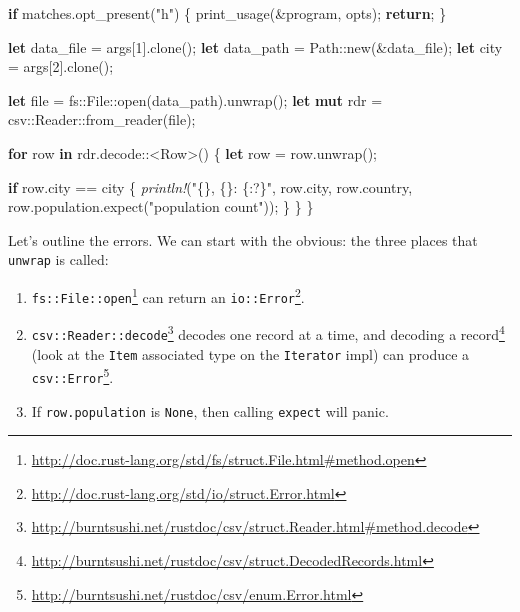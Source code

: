 \documentclass[a4paper,]{book}
\newenvironment{Shaded}{\begin{snugshade}}{\end{snugshade}}
\newcommand{\KeywordTok}[1]{\textcolor[rgb]{0.13,0.29,0.53}{\textbf{{#1}}}}
\newcommand{\DecValTok}[1]{\textcolor[rgb]{0.00,0.00,0.81}{{#1}}}
\newcommand{\StringTok}[1]{\textcolor[rgb]{0.31,0.60,0.02}{{#1}}}
\newcommand{\PreprocessorTok}[1]{\textcolor[rgb]{0.56,0.35,0.01}{\textit{{#1}}}}
\newcommand{\NormalTok}[1]{{#1}}
\renewcommand{\href}[2]{#2\footnote{\url{#1}}}
\providecommand{\tightlist}{%
  \setlength{\itemsep}{0pt}\setlength{\parskip}{0pt}}
\begin{document}
\begin{Shaded}
\begin{Highlighting}[]
    \KeywordTok{if} \NormalTok{matches.opt_present(}\StringTok{"h"}\NormalTok{) \{}
        \NormalTok{print_usage(&program, opts);}
        \KeywordTok{return}\NormalTok{;}
    \NormalTok{\}}
        
    \KeywordTok{let} \NormalTok{data_file = args[}\DecValTok{1}\NormalTok{].clone();}
    \KeywordTok{let} \NormalTok{data_path = Path::new(&data_file);}
    \KeywordTok{let} \NormalTok{city = args[}\DecValTok{2}\NormalTok{].clone();}
    
    \KeywordTok{let} \NormalTok{file = fs::File::open(data_path).unwrap();}
    \KeywordTok{let} \KeywordTok{mut} \NormalTok{rdr = csv::Reader::from_reader(file);}
    
    \KeywordTok{for} \NormalTok{row }\KeywordTok{in} \NormalTok{rdr.decode::<Row>() \{}
        \KeywordTok{let} \NormalTok{row = row.unwrap();}
    
        \KeywordTok{if} \NormalTok{row.city == city \{}
            \PreprocessorTok{println!}\NormalTok{(}\StringTok{"\{\}, \{\}: \{:?\}"}\NormalTok{,}
                \NormalTok{row.city, row.country,}
                \NormalTok{row.population.expect(}\StringTok{"population count"}\NormalTok{));}
        \NormalTok{\}}
    \NormalTok{\}}
\NormalTok{\}}
\end{Highlighting}
\end{Shaded}

Let's outline the errors. We can start with the obvious: the three
places that \texttt{unwrap} is called:

\begin{enumerate}
\def\labelenumi{\arabic{enumi}.}
\tightlist
\item
  \href{http://doc.rust-lang.org/std/fs/struct.File.html\#method.open}{\texttt{fs::File::open}}
  can return an
  \href{http://doc.rust-lang.org/std/io/struct.Error.html}{\texttt{io::Error}}.
\item
  \href{http://burntsushi.net/rustdoc/csv/struct.Reader.html\#method.decode}{\texttt{csv::Reader::decode}}
  decodes one record at a time, and
  \href{http://burntsushi.net/rustdoc/csv/struct.DecodedRecords.html}{decoding
  a record} (look at the \texttt{Item} associated type on the
  \texttt{Iterator} impl) can produce a
  \href{http://burntsushi.net/rustdoc/csv/enum.Error.html}{\texttt{csv::Error}}.
\item
  If \texttt{row.population} is \texttt{None}, then calling
  \texttt{expect} will panic.
\end{enumerate}
\end{document}
